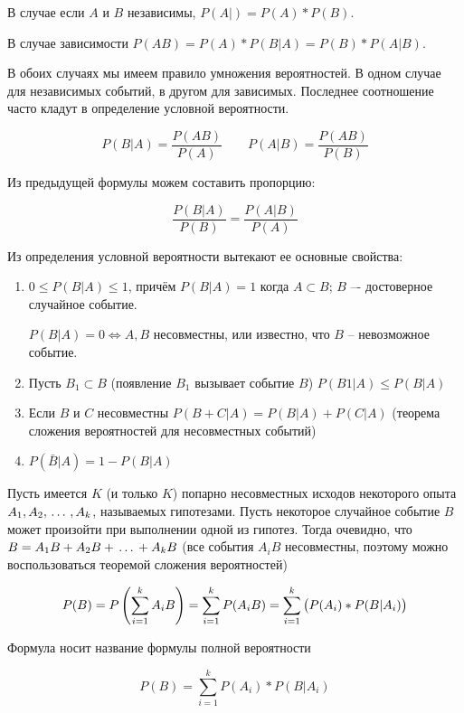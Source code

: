 \documentclass[a4paper,twoside,12pt]{report}
\begin{document}
	В случае если $A$ и $B$ независимы, $P(A|) = P(A)*P(B)$. 

	В случае зависимости $P(AB) = P(A)*P(B|A) = P(B)*P(A|B)$. 

	В обоих случаях мы имеем правило умножения вероятностей. В одном случае для независимых событий, в другом для зависимых. Последнее соотношение часто кладут в определение условной вероятности. 

	$$
	  P(B|A) = \frac{P(AB)}{P(A)} \qquad 
	  P(A|B) = \frac{P(AB)}{P(B)}
	$$

	Из предыдущей формулы можем составить пропорцию: 
	
	$$
	  \frac{P(B|A)}{P(B)} = \frac{P(A|B)}{P(A)}
	$$

	Из определения условной вероятности вытекают ее основные свойства:


	\begin{enumerate}

	\item	$0 \leqslant P(B|A) \leqslant 1$, причём $P(B|A) = 1$ когда $A \subset B$; $B$ –- достоверное случайное событие.

		$P(B|A) = 0 \Longleftrightarrow A, B$ несовместны, или известно, что $B$ – невозможное событие.

	
	\item	Пусть $B_1 \subset B$ (появление $B_1$ вызывает событие $B$) $P(B1|A) \leqslant P(B|A)$


	\item	Если $B$ и $C$ несовместны $P(B+C|A) = P(B|A) + P(C|A)$ (теорема сложения вероятностей для несовместных событий)


	\item	$P(\bar B|A) =  1 - P(B|A)$

	\end{enumerate}


	 Пусть имеется $K$ (и только $K$) попарно несовместных исходов некоторого опыта $A_1,A_2, \,\ldots\, ,A_k$, называемых гипотезами. Пусть некоторое случайное событие $B$ может произойти при выполнении одной из гипотез. Тогда очевидно, что $B = A_1B + A_2B + \,\ldots\, + A_kB$ (все события $A_iB$ несовместны, поэтому можно воспользоваться теоремой сложения вероятностей)

	$$
	  P(B) = P\left(\sum^k_{i=1}A_iB\right)
	       = \sum^k_{i=1}P(A_iB) 
	       = \sum^k_{i=1}\left(P(A_i)*P(B|A_i)\strut\right)
	$$

	Формула носит название формулы полной вероятности 

	$$
	  P(B) = \sum^k_{i=1}P(A_i)*P(B|A_i)
	$$
\end{document}
